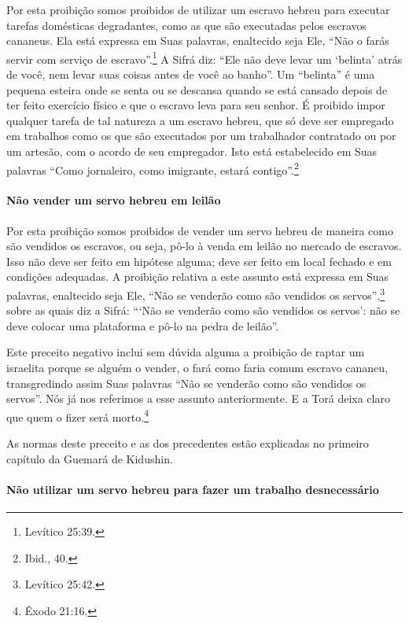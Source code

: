 Por esta proibição somos proibidos de utilizar um escravo hebreu para
executar tarefas domésticas degradantes, como as que são executadas
pelos escravos cananeus. Ela está expressa em Suas palavras, enaltecido
seja Ele, ``Não o farás servir com serviço de escravo''.\footnote{Levítico
25:39.} A Sifrá diz: ``Ele não deve levar um `belinta' atrás de você,
nem levar suas coisas antes de você ao banho''. Um ``belinta'' é uma
pequena esteira onde se senta ou se descansa quando se está cansado
depois de ter feito exercício físico e que o escravo leva para seu
senhor. É proibido impor qualquer tarefa de tal natureza a um escravo
hebreu, que só deve ser empregado em trabalhos como os que são
executados por um trabalhador contratado ou por um artesão, com o acordo
de seu empregador. Isto está estabelecido em Suas palavras ``Como
jornaleiro, como imigrante, estará contigo''.\footnote{Ibid., 40.}

\paragraph{Não vender um servo hebreu em leilão}

Por esta proibição somos proibidos de vender um servo hebreu de maneira
como são vendidos os escravos, ou seja, pô-lo à venda em leilão no
mercado de escravos. Isso não deve ser feito em hipótese alguma; deve
ser feito em local fechado e em condições adequadas. A proibição
relativa a este assunto está expressa em Suas palavras, enaltecido seja
Ele, ``Não se venderão como são vendidos os servos'',\footnote{Levítico 25:42.}
sobre as quais diz a Sifrá: ```Não se venderão como são vendidos os
servos': não se deve colocar uma plataforma e pô-lo na pedra de
leilão''.

Este preceito negativo inclui sem dúvida alguma a proibição de raptar
um israelita porque se alguém o vender, o fará como faria comum escravo
cananeu, transgredindo assim Suas palavras ``Não se venderão como são
vendidos os servos''. Nós já nos referimos a esse assunto
anteriormente. E a Torá deixa claro que quem o fizer será
morto.\footnote{Êxodo 21:16.}

As normas deste preceito e as dos precedentes estão explicadas no
primeiro capítulo da Guemará de Kidushin.


\paragraph{Não utilizar um servo hebreu para fazer um trabalho desnecessário}

